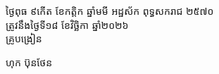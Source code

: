 \documentclass[a4paper,10pt]{article}
\begin{document}
\vspace{2pt}
\hfill
\begin{minipage}{9.8cm}
  {\centering
    ថ្ងៃពុធ ៩កើត ខែកត្តិក ឆ្នាំមមី អដ្ឋស័ក ពុទ្ធសករាជ ២៥៧០\\[2pt]
    ត្រូវនឹងថ្ងៃទី១៨ ខែវិច្ឆិកា ឆ្នាំ២០២៦\\[3pt]
    {\muol គ្រូបង្រៀន}\par}
  \vspace{28pt}
  \hfill{\muol ហុក ប៊ុនថែន}\hspace*{1.4cm}
\end{minipage}
\end{document}
